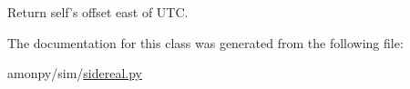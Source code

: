 \begin{DoxyVerb}Return self's offset east of UTC.
\end{DoxyVerb}
 

The documentation for this class was generated from the following file\-:\begin{DoxyCompactItemize}
\item 
amonpy/sim/\hyperlink{sidereal_8py}{sidereal.\-py}\end{DoxyCompactItemize}
